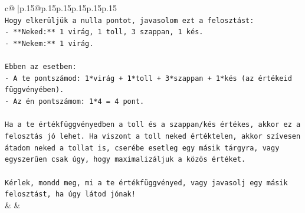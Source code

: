 \documentclass{article}
\begin{document}
{\begin{supertabular}{c@{$\;$}|p{.15\linewidth}@{}p{.15\linewidth}p{.15\linewidth}p{.15\linewidth}p{.15\linewidth}p{.15\linewidth}}
{{{\\ 
\texttt{Hogy elkerüljük a nulla pontot, javasolom ezt a felosztást:} \\
\texttt{{-} **Neked:** 1 virág, 1 toll, 3 szappan, 1 kés.} \\
\texttt{{-} **Nekem:** 1 virág.} \\
\\ 
\texttt{Ebben az esetben:} \\
\texttt{{-} A te pontszámod: 1*virág + 1*toll + 3*szappan + 1*kés (az értékeid függvényében).} \\
\texttt{{-} Az én pontszámom: 1*4 = 4 pont.} \\
\\ 
\texttt{Ha a te értékfüggvényedben a toll és a szappan/kés értékes, akkor ez a felosztás jó lehet. Ha viszont a toll neked értéktelen, akkor szívesen átadom neked a tollat is, cserébe esetleg egy másik tárgyra, vagy egyszerűen csak úgy, hogy maximalizáljuk a közös értéket.} \\
\\ 
\texttt{Kérlek, mondd meg, mi a te értékfüggvényed, vagy javasolj egy másik felosztást, ha úgy látod jónak!} \\
            }
        }
    }
    & & \\ \\


\end{supertabular}}
\end{document}
